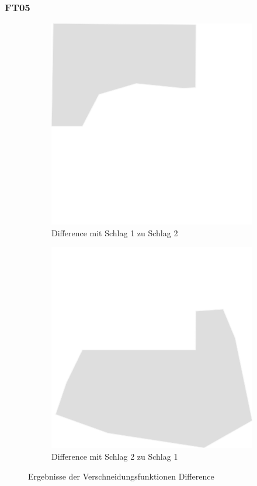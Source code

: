 \documentclass{beamer}
\begin{document}
\begin{frame}\frametitle{FT05}
\setcounter{subfigure}{0}\begin{figure}
\begin{subfigure}{.5\textwidth}
  \includegraphics[width=.7\linewidth]{../Abbildungen/st_difference1.png}
  \caption{Difference mit Schlag 1 zu Schlag 2}
\end{subfigure}%
\begin{subfigure}{.5\textwidth}
  \includegraphics[width=.7\linewidth]{../Abbildungen/st_difference2.png}
  \caption{Difference mit Schlag 2 zu Schlag 1}
\end{subfigure}
\caption{Ergebnisse der Verschneidungsfunktionen Difference}
\end{figure}
\end{frame}
 
\end{document}
